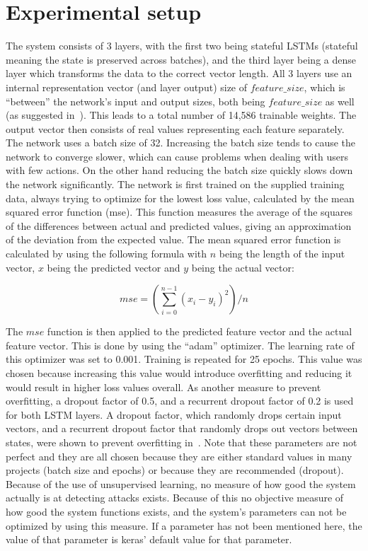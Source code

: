 \section{Experimental setup}
The system consists of 3 layers, with the first two being stateful LSTMs (stateful meaning the state is preserved across batches), and the third layer being a dense layer which transforms the data to the correct vector length. All 3 layers use an internal representation vector (and layer output) size of \(feature\_size \), which is \enquote{between} the network's input and output sizes, both being \(feature\_size \) as well (as suggested in~\cite{heaton2008introduction}). This leads to a total number of 14,586 trainable weights. The output vector then consists of real values representing each feature separately. The network uses a batch size of 32. Increasing the batch size tends to cause the network to converge slower, which can cause problems when dealing with users with few actions. On the other hand reducing the batch size quickly slows down the network significantly. The network is first trained on the supplied training data, always trying to optimize for the lowest loss value, calculated by the mean squared error function (mse). This function measures the average of the squares of the differences between actual and predicted values, giving an approximation of the deviation from the expected value. The mean squared error function is calculated by using the following formula with \(n\) being the length of the input vector, \(x\) being the predicted vector and \(y\) being the actual vector:

\begin{equation} \label{eq:mse}
mse = (\sum\limits_{i=0}^{n - 1} {(x_i - y_i)}^2) / n
\end{equation}

The \(mse\) function is then applied to the predicted feature vector and the actual feature vector. This is done by using the \enquote{adam} optimizer. The learning rate of this optimizer was set to 0.001. Training is repeated for 25 epochs. This value was chosen because increasing this value would introduce overfitting and reducing it would result in higher loss values overall. As another measure to prevent overfitting, a dropout factor of 0.5, and a recurrent dropout factor of 0.2 is used for both LSTM layers. A dropout factor, which randomly drops certain input vectors, and a recurrent dropout factor that randomly drops out vectors between states, were shown to prevent overfitting in~\cite{srivastava2014dropout}. Note that these parameters are not perfect and they are all chosen because they are either standard values in many projects (batch size and epochs) or because they are recommended (dropout). Because of the use of unsupervised learning, no measure of how good the system actually is at detecting attacks exists. Because of this no objective measure of how good the system functions exists, and the system's parameters can not be optimized by using this measure. If a parameter has not been mentioned here, the value of that parameter is keras' default value for that parameter.

